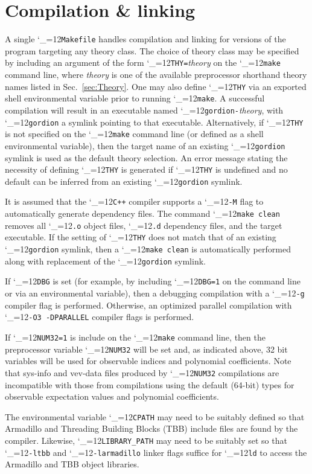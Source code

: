 \documentclass [12pt]{article}
\makeatletter
\renewcommand{\tt}{\begingroup\catcode`_=12\def\_{\string_}\tt@}
\newcommand{\tt@}[1]{\texttt{#1}\endgroup}
\makeatother
\begin{document}
\section {Compilation \& linking}

A single \tt{Makefile} handles compilation and linking for
versions of the program targeting any theory class.
The choice of theory class may be specified by including an
argument of the form \tt{THY=}\textit{theory} on the \tt{make} command line,
where \textit{theory} is one of the available preprocessor shorthand theory names
listed in Sec.~\ref{sec:Theory}.
One may also define \tt{THY} via an exported shell environmental
variable prior to running \tt{make}.
A successful compilation will result in an executable named
\tt{gordion-}\textit{theory}, with \tt{gordion} a symlink pointing
to that executable.
Alternatively, if \tt{THY} is not specified on the \tt{make} command line
(or defined as a shell environmental variable), then the target name of an existing
\tt{gordion} symlink is used as the default theory selection.
An error message stating the necessity of defining \tt{THY} is generated
if \tt{THY} is undefined and no default can be inferred from an existing
\tt{gordion} symlink.

It is assumed that the \tt{C++} compiler supports a \tt{-M}
flag to automatically generate dependency files.
The command \tt{make clean} removes all \tt{.o} object files, \tt{.d} dependency
files, and the target executable.
If the setting of \tt{THY} does not match that of an existing
\tt{gordion} symlink, then a \tt{make clean} is automatically performed
along with replacement of the \tt{gordion} symlink.

If \tt{DBG} is set (for example, by including \tt{DBG=1} on the command line
or via an environmental variable), then a debugging compilation
with a \tt{-g} compiler flag is performed.
Otherwise, an optimized parallel compilation
with \tt{-O3 -DPARALLEL} compiler flags is performed.

If \tt{NUM32=1} is include on the \tt{make} command line, then the
preprocessor variable \tt{NUM32} will be set and, as indicated above,
32 bit variables will be used for observable indices and polynomial coefficients.
Note that sys-info and vev-data files produced by \tt{NUM32} compilations are
incompatible with those from compilations using the default (64-bit) types
for observable expectation values and polynomial coefficients.

The environmental variable
\tt{CPATH} may need to be suitably defined
so that Armadillo and Threading Building Blocks (TBB) include files
are found by the compiler.
Likewise,
\tt{LIBRARY_PATH} may need to be suitably set so that
\tt{-ltbb} and \tt{-larmadillo} linker flags suffice for
\tt{ld} to access the Armadillo and TBB object libraries.
\end{document}
